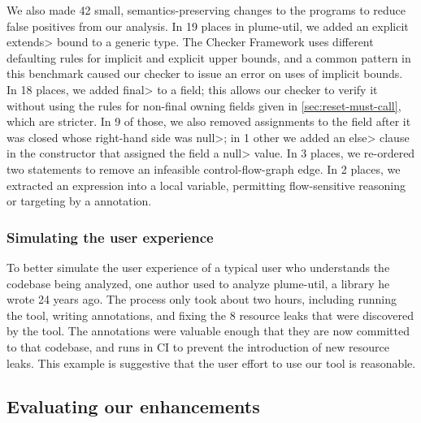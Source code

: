 We also
made 42 small, semantics-preserving changes to the programs to reduce
false positives from our analysis.
%
In 19 places in plume-util, we added an explicit \<extends> bound to a generic type.
The Checker Framework uses different defaulting rules for implicit and explicit
upper bounds, and a common pattern in this benchmark caused our checker to issue
an error on uses of implicit bounds.
%
In 18 places, we added \<final> to a field; this allows our checker to verify it without using
the rules for non-final owning fields given in \cref{sec:reset-must-call}, which are stricter.
In 9 of those, we also removed assignments to the field after it was closed whose right-hand
side was \<null>; in 1 other we added an \<else> clause in the constructor that assigned the field
a \<null> value.
%
In 3 places, we re-ordered two statements to remove an
infeasible control-flow-graph edge.
%
In 2 places, we extracted an expression into a local variable, permitting
flow-sensitive reasoning or targeting by a \CreatesMustCallFor annotation.

\subsubsection{Simulating the user experience}
\label{sec:plume-util}

To better simulate the user experience of a typical user who understands
the codebase being analyzed,
one author used \tool to analyze plume-util,
a library he wrote 24 years ago.
The process only took about two hours, including running the tool,
writing annotations, and fixing the 8 resource leaks that were discovered by the tool.
The annotations were valuable enough that they
are now committed to that codebase, and \tool runs in CI
to prevent the introduction of new resource leaks.
This example is suggestive that the user effort to use our tool is reasonable.


\subsection{Evaluating our enhancements}
\label{sec:ablation}

